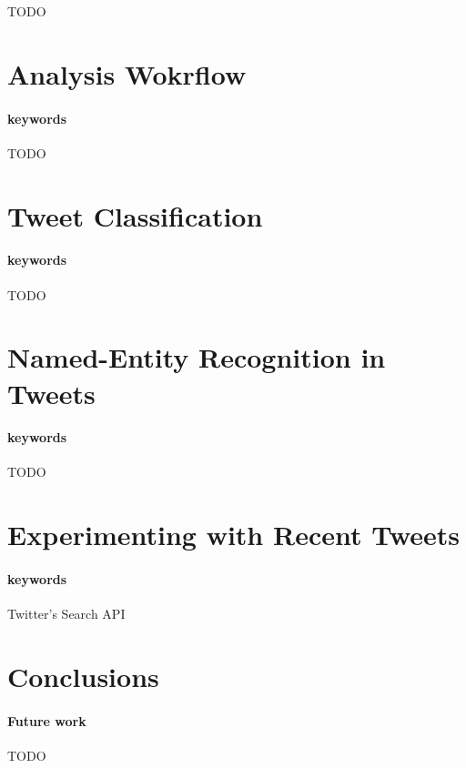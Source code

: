 \documentclass[letterpaper,twocolumn,10pt]{article}
\begin{document}
TODO

\section{Analysis Wokrflow}

\paragraph{keywords} TODO

\section{Tweet Classification}

\paragraph{keywords} TODO

\section{Named-Entity Recognition in Tweets}

\paragraph{keywords} TODO

\section{Experimenting with Recent Tweets}

\paragraph{keywords} Twitter's Search API

\section{Conclusions}

\paragraph{Future work} TODO


{\footnotesize 
}
\end{document}
